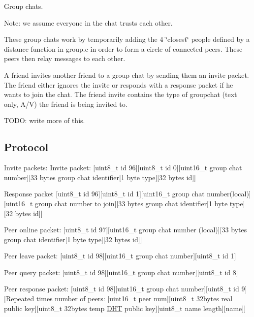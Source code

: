Group chats.

Note\+: we assume everyone in the chat trusts each other.

These group chats work by temporarily adding the 4 \char`\"{}closest\char`\"{} people defined by a distance function in group.\+c in order to form a circle of connected peers. These peers then relay messages to each other.

A friend invites another friend to a group chat by sending them an invite packet. The friend either ignores the invite or responds with a response packet if he wants to join the chat. The friend invite contains the type of groupchat (text only, A/\+V) the friend is being invited to.

T\+O\+D\+O\+: write more of this.

\subsection*{Protocol}

Invite packets\+: Invite packet\+: \mbox{[}uint8\+\_\+t id 96\mbox{]}\mbox{[}uint8\+\_\+t id 0\mbox{]}\mbox{[}uint16\+\_\+t group chat number\mbox{]}\mbox{[}33 bytes group chat identifier\mbox{[}1 byte type\mbox{]}\mbox{[}32 bytes id\mbox{]}\mbox{]}

Response packet \mbox{[}uint8\+\_\+t id 96\mbox{]}\mbox{[}uint8\+\_\+t id 1\mbox{]}\mbox{[}uint16\+\_\+t group chat number(local)\mbox{]}\mbox{[}uint16\+\_\+t group chat number to join\mbox{]}\mbox{[}33 bytes group chat identifier\mbox{[}1 byte type\mbox{]}\mbox{[}32 bytes id\mbox{]}\mbox{]}

Peer online packet\+: \mbox{[}uint8\+\_\+t id 97\mbox{]}\mbox{[}uint16\+\_\+t group chat number (local)\mbox{]}\mbox{[}33 bytes group chat identifier\mbox{[}1 byte type\mbox{]}\mbox{[}32 bytes id\mbox{]}\mbox{]}

Peer leave packet\+: \mbox{[}uint8\+\_\+t id 98\mbox{]}\mbox{[}uint16\+\_\+t group chat number\mbox{]}\mbox{[}uint8\+\_\+t id 1\mbox{]}

Peer query packet\+: \mbox{[}uint8\+\_\+t id 98\mbox{]}\mbox{[}uint16\+\_\+t group chat number\mbox{]}\mbox{[}uint8\+\_\+t id 8\mbox{]}

Peer response packet\+: \mbox{[}uint8\+\_\+t id 98\mbox{]}\mbox{[}uint16\+\_\+t group chat number\mbox{]}\mbox{[}uint8\+\_\+t id 9\mbox{]}\mbox{[}Repeated times number of peers\+: \mbox{[}uint16\+\_\+t peer num\mbox{]}\mbox{[}uint8\+\_\+t 32bytes real public key\mbox{]}\mbox{[}uint8\+\_\+t 32bytes temp \hyperlink{struct_d_h_t}{D\+H\+T} public key\mbox{]}\mbox{[}uint8\+\_\+t name length\mbox{]}\mbox{[}name\mbox{]}\mbox{]}

